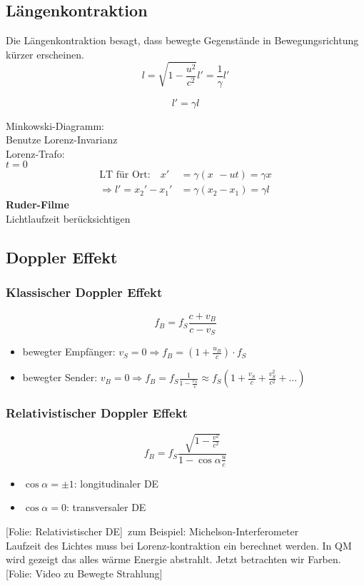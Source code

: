 \documentclass[titlepage,11pt,a4paper,ngerman]{report}
\newcommand{\tx}[1]{\textrm{#1}}
\newcommand{\folie}[1]{\color{gray}[Folie: #1]\color{black}}
\newcommand{\lcom}[1]{\color{MidnightBlue}#1\color{black}}
\newcommand{\frbox}[2]{\begin{tcolorbox}[colback=white,colframe=red!75!black,fonttitle=\bfseries,title=#1]#2\end{tcolorbox}}
\begin{document}
\subsection{Längenkontraktion}
Die Längenkontraktion besagt, dass bewegte Gegenstände in Bewegungsrichtung kürzer erscheinen.
\begin{equation*}
l = \sqrt{1 - \frac{u^2}{c^2}} l' = \frac{1}{\gamma} l'
\end{equation*}
\frbox{Längenkontraktion}{\begin{equation*}
	l' = \gamma l
	\end{equation*}}
Minkowski-Diagramm:\\[5pt]
Benutze Lorenz-Invarianz\\
Lorenz-Trafo:\\
$ t = 0 $
\begin{align*}
\tx{LT für Ort:} \quad x' &= \gamma(x\phantom{_2} - ut) = \gamma x\\
\Rightarrow l' = x_2' - x_1' &= \gamma (x_2 - x_1) = \gamma l
\end{align*}
\textbf{Ruder-Filme}\\
Lichtlaufzeit berücksichtigen

\subsection{Doppler Effekt}
\subsubsection{Klassischer Doppler Effekt}
\begin{equation*}
f_B = f_S \frac{c + v_B}{c - v_S}
\end{equation*}
\begin{itemize}
	\item bewegter Empfänger: $ v_S = 0 \Rightarrow f_B = \left(1 + \frac{u_B}{c}\right) \cdot f_S $
	\item bewegter Sender: $ v_B = 0 \Rightarrow f_B = f_S \frac{1}{1 - \frac{v_S}{c}} \approx f_S \left(1 + \frac{v_S}{c} + \frac{v_S^2}{c^2} + \dots \right) $
\end{itemize}

\subsubsection{Relativistischer Doppler Effekt}
\begin{equation*}
f_B = f_S \frac{\sqrt{1 - \frac{v^2}{c^2}}}{1 - \cos \alpha \frac{u}{c}}
\end{equation*}
\begin{itemize}
	\item $ \cos \alpha = \pm 1 $: longitudinaler DE
	\item $ \cos \alpha = 0 $: transversaler DE
\end{itemize}
\folie{Relativistischer DE}\ zum Beispiel: Michelson-Interferometer\\
\lcom{Laufzeit des Lichtes muss bei Lorenz-kontraktion ein berechnet werden. In QM wird gezeigt das alles wärme Energie abstrahlt. Jetzt betrachten wir Farben.}\\
\folie{Video zu Bewegte Strahlung}
\end{document}
